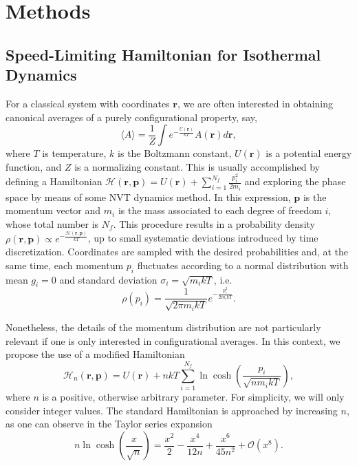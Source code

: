 \documentclass[
aip,
jcp,
reprint,
]{revtex4-1}
\newcommand{\vt}[1]{\boldsymbol{\mathbf{#1}}}          %
\newcommand{\nn}{n}
\begin{document}
\section{Methods}
\label{sec:methods}

\subsection{Speed-Limiting Hamiltonian for Isothermal Dynamics}

For a classical system with coordinates $\vt r$, we are often interested in obtaining canonical averages of a purely configurational property, say,
\begin{equation}
\label{eq:configurational average}
\langle A \rangle = \frac{1}{Z} \int e^{-\frac{U(\vt r)}{kT}} A(\vt r) d\vt r,
\end{equation}
where $T$ is temperature, $k$ is the Boltzmann constant, $U(\vt r)$ is a potential energy function, and $Z$ is a normalizing constant.
This is usually accomplished by defining a Hamiltonian $\mathcal{H}(\vt r, \vt p) = U(\vt r) + \sum_{i=1}^{N_f} \frac{p_i^2}{2 m_i}$ and exploring the phase space by means of some NVT dynamics method.
In this expression, $\vt p$ is the momentum vector and $m_i$ is the mass associated to each degree of freedom $i$, whose total number is $N_f$.
This procedure results in a probability density $\rho(\vt r, \vt p) \propto e^{-\frac{\mathcal{H}(\vt r, \vt p)}{kT}}$, up to small systematic deviations introduced by time discretization.
Coordinates are sampled with the desired probabilities and, at the same time, each momentum $p_i$ fluctuates according to a normal distribution with mean $g_i = 0$ and standard deviation $\sigma_i = \sqrt{m_i k T}$, i.e.
\begin{equation}
\label{eq:gaussian momentum distribution}
\rho(p_i) = \frac{1}{\sqrt{2 \pi m_i k T}} e^{-\frac{p_i^2}{2 m_i k T}}.
\end{equation}

Nonetheless, the details of the momentum distribution are not particularly relevant if one is only interested in configurational averages.
In this context, we propose the use of a modified Hamiltonian
\begin{equation}
\label{eq:modified hamiltonian}
\mathcal{H}_n(\vt r, \vt p) = U(\vt r) + \nn kT \sum_{i=1}^{N_f} \ln \cosh\left(\frac{p_i}{\sqrt{\nn m_i k T}}\right),
\end{equation}
where $\nn$ is a positive, otherwise arbitrary parameter.
For simplicity, we will only consider integer values.
The standard Hamiltonian is approached by increasing $\nn$, as one can observe in the Taylor series expansion
\begin{equation*}
\nn \ln \cosh \left(\frac{x}{\sqrt{\nn}}\right) = \frac{x^2}{2} - \frac{x^4}{12 \nn} + \frac{x^6}{45 \nn^2} + \mathcal{O}(x^8).
\end{equation*}
\end{document}
